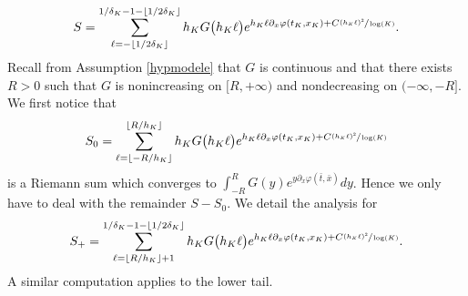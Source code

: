\documentclass[JEP,XML,SOM,Unicode,published]{cedram}
\theoremstyle{plain}
\theoremstyle{remark}
\begin{document}
\[
S= \sum_{\ell=-\lfloor 1/2\delta_K\rfloor}^{1/\delta_K-1-\lfloor 1/2\delta_K\rfloor} h_K G\big(h_K\ell \big)e^{h_K\ell\partial_x\varphi(t_K,x_K)+C\sfrac{(h_K\ell)^2}{\log(K)}}.
\]
Recall from Assumption \ref{hypmodele} that $G$ is continuous and that there exists $R>0$ such that $G$ is nonincreasing on $[R,+\infty)$ and nondecreasing on $(-\infty,-R]$. We first notice that
\[
S_0=\sum_{\ell=\lfloor -R/h_K \rfloor}^{\lfloor R/h_K\rfloor } h_K G\big(h_K\ell \big)e^{h_K\ell\partial_x\varphi(t_K,x_K)+C\sfrac{(h_K\ell)^2}{\log(K)}}
\]
is a Riemann sum which converges to $\int_{-R}^R G(y) e^{y\partial_x\varphi(\bar t,\bar x)}dy$. Hence we only have to deal with the remainder $S-S_0$. We detail the analysis for\vspace*{-3pt}
\[
S_+=\sum_{\ell= \lfloor R/h_K\rfloor +1}^{1/\delta_K-1-\lfloor 1/2\delta_K\rfloor}h_K G\big(h_K\ell \big)e^{h_K\ell\partial_x\varphi(t_K,x_K)+C\sfrac{(h_K\ell)^2}{\log(K)}}.
\]
A similar computation applies to the lower tail.
\end{document}
